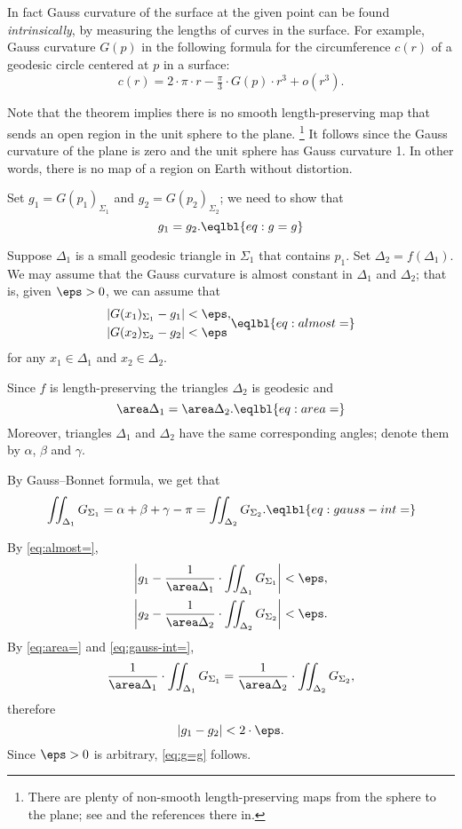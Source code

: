 In fact Gauss curvature of the surface at the given point can be found \emph{intrinsically},
by measuring the lengths of curves in the surface.
For example, Gauss curvature $G(p)$ in the following formula for the circumference $c(r)$ of a geodesic circle centered at $p$ in a surface: 
\[c(r)=2\cdot\pi\cdot r-\tfrac\pi3\cdot G(p)\cdot r^3+o(r^3).\]

Note that the theorem implies there is no smooth length-preserving map that sends an open region in the unit sphere to the plane.%
\footnote{There are plenty of non-smooth length-preserving maps from the sphere to the plane; see \cite{petrunin-yashinski} and the references there in.}
It follows since the Gauss curvature of the plane is zero and the unit sphere has Gauss curvature 1. 
In other words, there is no map of a region on Earth without distortion.

Set $g_1=G(p_1)_{\Sigma_1}$ and $g_2=G(p_2)_{\Sigma_2}$;
we need to show that 
\[g_1=g_2.\eqlbl{eq:g=g}\]

Suppose $\Delta_1$ is a small geodesic triangle in $\Sigma_1$ that contains $p_1$.
Set $\Delta_2=f(\Delta_1)$.
We may assume that the Gauss curvature is almost constant in $\Delta_1$ and $\Delta_2$;
that is, given $\eps>0$, we can assume that 
\[
\begin{aligned}
|G(x_1)_{\Sigma_1}-g_1|&<\eps,
\\
|G(x_2)_{\Sigma_2}-g_2|&<\eps
\end{aligned}
\eqlbl{eq:almost=}\]
for any $x_1\in \Delta_1$ and $x_2\in \Delta_2$.

Since $f$ is length-preserving the triangles $\Delta_2$ is geodesic and
\[\area\Delta_1=\area\Delta_2.\eqlbl{eq:area=}\]
Moreover, triangles $\Delta_1$ and $\Delta_2$ have the same corresponding angles; denote them by $\alpha$, $\beta$ and $\gamma$.

By Gauss--Bonnet formula, we get that 
\[\iint_{\Delta_1}G_{\Sigma_1}=\alpha+\beta+\gamma-\pi=\iint_{\Delta_2}G_{\Sigma_2}.\eqlbl{eq:gauss-int=}\]

By \ref{eq:almost=}, 
\begin{align*}
\left|g_1-\frac1{\area\Delta_1}\cdot\iint_{\Delta_1}G_{\Sigma_1}\right|&<\eps,
\\
\left|g_2-\frac1{\area\Delta_2}\cdot\iint_{\Delta_2}G_{\Sigma_2}\right|&<\eps.
\end{align*}
By \ref{eq:area=} and \ref{eq:gauss-int=},
\[\frac1{\area\Delta_1}\cdot\iint_{\Delta_1}G_{\Sigma_1}
=
\frac1{\area\Delta_2}\cdot\iint_{\Delta_2}G_{\Sigma_2},\]
therefore
\[|g_1-g_2|<2\cdot\eps.\]
Since $\eps>0$ is arbitrary, \ref{eq:g=g} follows.
\qeds
















